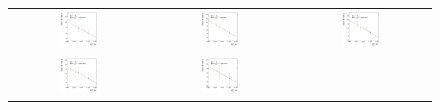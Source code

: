 \begin{figure}[ht]
\begin{tabular}{ccc}
    \includegraphics[width=0.3\textwidth]{figures/ResFit_Spring10QCDFlat_CB_Eta0_ExtrapolatedPar1_PtBin6} &
    \includegraphics[width=0.3\textwidth]{figures/ResFit_Spring10QCDFlat_CB_Eta0_ExtrapolatedPar1_PtBin7} &
    \includegraphics[width=0.3\textwidth]{figures/ResFit_Spring10QCDFlat_CB_Eta0_ExtrapolatedPar1_PtBin8} \\

    \includegraphics[width=0.3\textwidth]{figures/ResFit_Spring10QCDFlat_CB_Eta0_ExtrapolatedPar1_PtBin9} &
    \includegraphics[width=0.3\textwidth]{figures/ResFit_Spring10QCDFlat_CB_Eta0_ExtrapolatedPar1_PtBin10} & \\
  \end{tabular}
\caption{}
\label{fig:ResFit:App:CB:ExtrapolatedPar1}
\end{figure}

